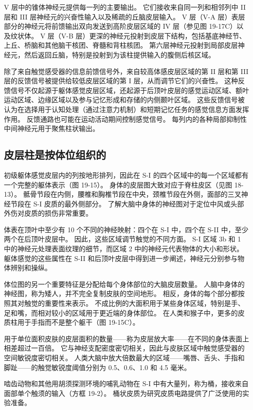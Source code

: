 V 层中的锥体神经元提供每一列的主要输出。 它们接收来自同一列和相邻列中 II 层和 III 层神经元的兴奋性输入以及稀疏的丘脑皮层输入。 V 层（V-A 层）表层部分的神经元将前馈输出双向发送到高阶皮层区域的 IV 层（参见图 19-17C）以及纹状体。 V 层（V-B 层）更深的神经元投射到皮层下结构，包括基底神经节、上丘、桥脑和其他脑干核团、脊髓和背柱核团。 第六层神经元投射到局部皮层神经元，然后返回丘脑，特别是投射到为该柱提供输入的腹侧后核区域。

除了来自触觉感受器的信息前馈信号外，来自较高体感皮层区域的第 II 层和第 III 层的反馈信号被提供给较低皮层区域的第 I 层，从而调节它们的兴奋性。 这种反馈信号不仅起源于躯体感觉皮层区域，还起源于后顶叶皮层的感觉运动区域、额叶运动区域、边缘区域以及参与记忆形成和存储的内侧颞叶区域。 这些反馈信号被认为在选择用于认知处理（通过注意力机制）和短期记忆任务的感觉信息方面发挥作用。 反馈通路也可能在运动活动期间控制感觉信号。 每列内的各种局部抑制性中间神经元用于聚焦柱状输出。

\subsection{皮层柱是按体位组织的}
初级躯体感觉皮层内的列按地形排列，因此在 S-I 的四个区域中的每一个区域都有一个完整的躯体表示（图 19-15）。 身体的皮层图大致对应于脊柱皮区（见图 18-13）。 骶骨节段在内侧，腰椎和胸椎节段在中央，颈椎节段在外侧，面部的三叉神经节段在 S-I 皮质的最外侧部分。 了解大脑中身体的神经图对于定位中风或头部外伤对皮质的损伤非常重要。

体表在顶叶中至少有 10 个不同的神经映射：四个在 S-I 中，四个在 S-II 中，至少两个在后顶叶皮层中。 因此，这些区域调节触觉的不同方面。 S-I 区域 3b 和 1 中的神经元处理表面纹理的细节，而区域 2 中的神经元代表物体的大小和形状。 躯体感觉的这些属性在 S-II 和后顶叶皮层中得到进一步阐述，神经元分别参与物体辨别和操纵。

体位图的另一个重要特征是分配给每个身体部位的大脑皮层数量。 人脑中身体的神经图，称为矮人，并不完全复制皮肤的空间地形。 相反，身体的每个部分都按照其对触觉的重要性来表示。 不成比例的大面积用于某些身体区域，特别是手、足和嘴，而相对较小的区域用于更近端的身体部位。 在人类和猴子中，更多的皮质柱用于手指而不是整个躯干（图 19-15C）。

用于单位面积皮肤的皮层面积的数量——称为皮层放大率——在不同的身体表面上相差超过一百倍。 它与神经支配密度密切相关，因此与皮肤区域中触觉感受器的空间敏锐度密切相关。 人类大脑中放大倍数最大的区域——嘴唇、舌头、手指和脚趾——的触觉敏锐度阈值分别为 0.5、0.6、1.0 和 4.5 毫米。

啮齿动物和其他用胡须探测环境的哺乳动物在 S-I 中有大量列，称为桶，接收来自面部单个触须的输入（方框 19-2）。 桶状皮质为研究皮质电路提供了广泛使用的实验准备。

